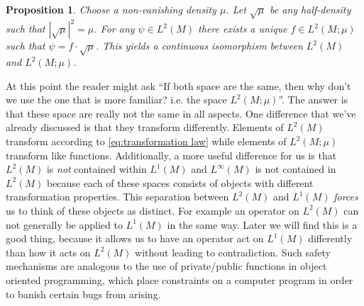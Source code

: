 \documentclass[12pt]{amsart}
\newtheorem{prop}[thm]{Proposition}
\DeclareMathOperator{\Dens}{Dens}
\begin{document}
\begin{prop}
	Choose a non-vanishing density $\mu$.
	Let $\sqrt{\mu}$ be any half-density such that $| \sqrt{\mu} |^{2} = \mu$.
	For any $\psi \in L^2(M)$ there exists a unique $f \in L^2(M ; \mu)$ such that $\psi = f \cdot  \sqrt{\mu}$.
	This yields a continuous isomorphism between $L^2(M)$ and $L^2(M ; \mu)$.
\end{prop}
%	

At this point the reader might ask ``If both space are the same, then why don't we use the one that is more familiar?  i.e. the space $L^{2}(M;\mu)$''.
The answer is that these space are really not the same in all aspects.
One difference that we've already discussed is that they transform differently.
Elements of $L^{2}(M)$ transform according to \eqref{eq:transformation law} while elements of $L^{2}(M;\mu)$ transform like functions.
Additionally, a more useful difference for us is that $L^{2}(M)$ is \emph{not} contained within $L^{1}(M)$ and $L^{\infty}(M)$ is not contained in $L^{2}(M)$
because each of these spaces consists of objects with different transformation properties.
This separation between $L^{2}(M)$ and $L^{1}(M)$ \emph{forces} us to think of these objects as distinct.
For example an operator on $L^{2}(M)$ can not generally be applied to $L^{1}(M)$ in the same way.
Later we will find this is a good thing, because it allows us to have an operator act on $L^{1}(M)$ differently than how it acts on $L^{2}(M)$
without leading to contradiction.
Such safety mechanisms are analogous to the use of private/public functions in object oriented programming, which place constraints on a computer program in order to banish certain bugs from arising.
\end{document}
